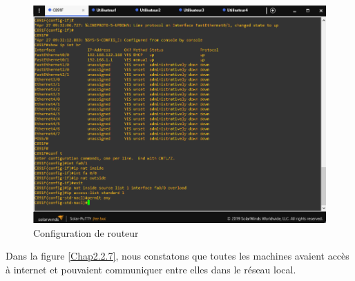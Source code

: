 \begin{figure}[H]
 \centering
    \includegraphics[width=16cm]{Images/BRades-Topologie6.png}
    \caption{Configuration de routeur}
    \label{Chap2.2.6}
\end{figure}


Dans la figure \ref{Chap2.2.7}, nous constatons que toutes les machines avaient accès à internet et pouvaient communiquer entre elles dans le réseau local.


